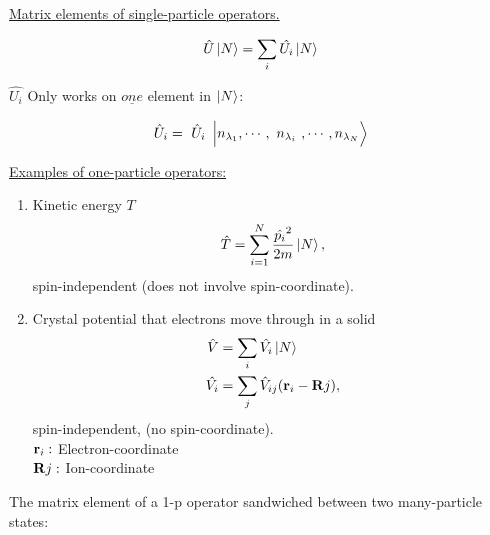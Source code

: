 \noindent \uline{Matrix elements of single-particle operators.}



\begin{equation*}
	\hat{U} \ket{N}= \sum_i \hat{U_i} \ket{N}
\end{equation*}

$\hat{U_i}$ Only works on $\underline{one}$ element in $\ket{N}$:






\begin{equation*}
	\hat{U}_i = \tikzmark{node1}{\hat{U}_i}\ket{n_{\lambda_1},\cdots, \tikzmark[black]{node2}{n_{\lambda_i}}, \cdots, n_{\lambda_N}} 
\end{equation*}
\linebreak


\noindent \uline{Examples of one-particle operators:}

\begin{enumerate}
	\item
	Kinetic energy $T$
	\begin{equation}
		\hat{T}= \sum_{i=1}^{N} \frac{\hat{p_i}^2}{2m} \ket{N},
	\end{equation}
	spin-independent (does not involve spin-coordinate).
	\item
	Crystal potential that electrons move through in a solid
	\begin{align}
		\hat{V} &= \sum_i \hat{V_i} \ket{N}\\
		\hat{V_i} &= \sum_j \hat{V}_{ij} (\vb{r}_i-\vb{R}j),
	\end{align}
	spin-independent, (no spin-coordinate).\\
	$\vb{r}_i:$ Electron-coordinate\\
	$\vb{R}j:$ Ion-coordinate
\end{enumerate}

\noindent The matrix element of a 1-p operator sandwiched between two many-particle states:

